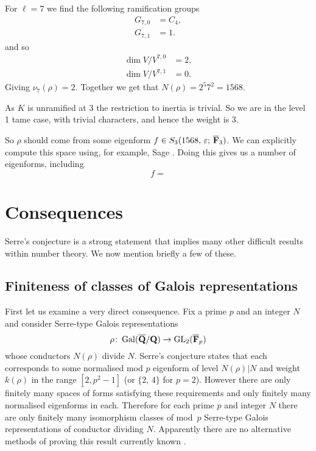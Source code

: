 \documentclass[a4paper,12pt]{article}
\begin{document}
\begin{ex}
For $\ell = 7$ we find the following ramification groups
\begin{align*}
G_{7,0}&= C_4,\\
G_{7,1}&= 1.
\end{align*}
and so
\begin{align*}
\dim V/V^{7,0} &= 2,\\
\dim V/V^{7,1} &= 0.
\end{align*}
Giving $\nu_7(\rho) = 2$.
Together we get that $N(\rho) = 2^{5}7^{2} = 1568$.

As $K$ is unramified at 3 the restriction to inertia is trivial.
So we are in the level 1 tame case, with trivial characters, and hence the weight is 3.

So $\rho$ should come from some eigenform $f \in S_3(1568,\,\varepsilon;\,\overline{\mathbf{F}}_3)$.
We can explicitly compute this space using, for example, Sage \cite{Sage}.
Doing this gives us a number of eigenforms, including
\[
f = 
\]

\end{ex}


\section{Consequences}
Serre's conjecture is a strong statement that implies many other difficult results within number theory.
We now mention briefly a few of these.


\subsection{Finiteness of classes of Galois representations}
First let us examine a very direct consequence.
Fix a prime $p$ and an integer $N$ and consider Serre-type Galois representations
\[
\rho\colon \operatorname{Gal}(\overline{\mathbf{Q}}/\mathbf{Q}) \to \operatorname{GL}_2(\overline{\mathbf{F}}_p)
\]
whose conductors $N(\rho)$ divide $N$.
Serre's conjecture states that each corresponds to some normalised mod $p$ eigenform of level $N(\rho)|N$ and weight $k(\rho)$ in the range $[2,p^2-1]$ (or $\{2,\,4\}$ for $p=2$).
However there are only finitely many spaces of forms satisfying these requirements and only finitely many normalised eigenforms in each.
Therefore for each prime $p$ and integer $N$ there are only finitely many isomorphism classes of mod~$p$ Serre-type Galois representations of conductor dividing $N$.
Apparently there are no alternative methods of proving this result currently known \cite{WieseMod}.
\end{document}
